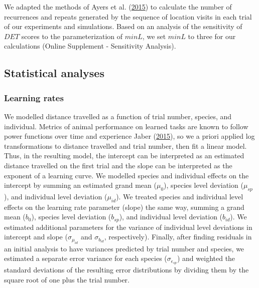 \documentclass[twoside,12pt,final]{ucthesis-CA2012}
\begin{document}
\begin{ucmainmatter}
We adapted the methods of Ayers et al. (\protect\hyperlink{ref-ayers2015}{2015}) to calculate the number of recurrences and repeats generated by the sequence of location visits in each trial of our experiments and simulations. Based on an analysis of the sensitivity of \(DET\) scores to the parameterization of \(minL\), we set \(minL\) to three for our calculations (Online Supplement - Sensitivity Analysis).

\hypertarget{statistical-analyses}{%
\subsection{Statistical analyses}\label{statistical-analyses}}

\hypertarget{learning-rates}{%
\subsubsection{Learning rates}\label{learning-rates}}

We modelled distance travelled as a function of trial number, species, and individual. Metrics of animal performance on learned tasks are known to follow power functions over time and experience Jaber (\protect\hyperlink{ref-jaber2015}{2015}), so we a priori applied log transformations to distance travelled and trial number, then fit a linear model. Thus, in the resulting model, the intercept can be interpreted as an estimated distance travelled on the first trial and the slope can be interpreted as the exponent of a learning curve. We modelled species and individual effects on the intercept by summing an estimated grand mean (\(\mu_0\)), species level deviation (\(\mu_{sp}\)), and individual level deviation (\(\mu_{id}\)). We treated species and individual level effects on the learning rate parameter (slope) the same way, summing a grand mean (\(b_0\)), species level deviation (\(b_{sp}\)), and individual level deviation (\(b_{id}\)). We estimated additional parameters for the variance of individual level deviations in intercept and slope (\(\sigma_{\mu_{id}}\) and \(\sigma_{b_{id}}\), respectively). Finally, after finding residuals in an initial analysis to have variances predicted by trial number and species, we estimated a separate error variance for each species (\(\sigma_{\epsilon_{sp}}\)) and weighted the standard deviations of the resulting error distributions by dividing them by the square root of one plus the trial number.


\end{ucmainmatter}
\end{document}
